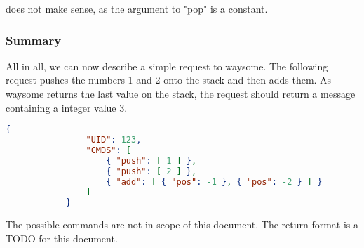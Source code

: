         does not make sense, as the argument to "pop" is a constant.

    \subsubsection{Summary}

        All in all, we can now describe a simple request to waysome. The
        following request pushes the numbers 1 and 2 onto the stack and then
        adds them. As waysome returns the last value on the stack, the request
        should return a message containing a integer value 3.

        \begin{lstlisting}[language=json]
            {
                "UID": 123,
                "CMDS": [
                    { "push": [ 1 ] },
                    { "push": [ 2 ] },
                    { "add": [ { "pos": -1 }, { "pos": -2 } ] }
                ]
            }
        \end{lstlisting}

        The possible commands are not in scope of this document.
        The return format is a TODO for this document.
